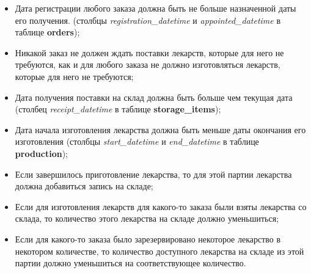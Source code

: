 \documentclass[a4paper]{article}
\newcommand{\dbtable}[1]{\textbf{#1}}
\newcommand{\dbtableref}[1]{\textit{#1}}
\begin{document}
\begin{itemize}
				\item Дата регистрации любого заказа должна быть не больше назначенной даты его получения. (столбцы \dbtableref{registration\_datetime} и \dbtableref{appointed\_datetime} в таблице \dbtable{orders});
				
				\item Никакой заказ не должен ждать поставки лекарств, которые для него не требуются, как и для любого заказа не должно изготовляться лекарств, которые для него не требуются;
					
				\item Дата получения поставки на склад должна быть больше чем текущая дата (столбец \dbtableref{receipt\_datetime} в таблице \dbtable{storage\_items});
				
				\item Дата начала изготовления лекарства должна быть меньше даты окончания его изготовления (столбцы \dbtableref{start\_datetime} и \dbtableref{end\_datetime} в таблице \dbtable{production});
				
				\item Если завершилось приготовление лекарства, то для этой партии лекарства должна добавиться запись на складе;
			
				\item Если для изготовления лекарств для какого-то заказа были взяты лекарства со склада, то количество этого лекарства на складе должно уменьшиться;
			
				\item Если для какого-то заказа было зарезервировано некоторое лекарство в некотором количестве, то количество доступного лекарства на складе из этой партии должно уменьшиться на соответствующее количество.
			\end{itemize}
			
	\newpage
	
\end{document}
